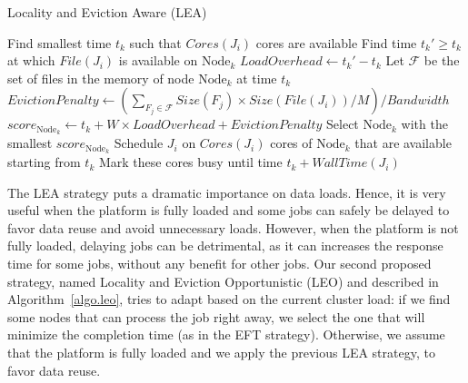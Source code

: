 \documentclass[conference,10pt]{IEEEtran}
\newcommand{\Node}[1]{\ensuremath{\mathrm{Node}_{#1}}\xspace}
\newcommand{\file}{\ensuremath{\mathit{File}}\xspace}
\newcommand{\size}{\ensuremath{\mathit{Size}}\xspace}
\newcommand{\memory}{\ensuremath{\mathit{M}}\xspace}
\newcommand{\bandwidth}{\mathit{Bandwidth}\xspace}
\newcommand{\core}{\mathit{Cores}\xspace}
\newcommand{\walltime}{\mathit{WallTime}\xspace}
\newcommand{\nodeset}{\ensuremath{\mathbb{N}}\xspace}
\begin{document}
\begin{algorithm}[t]%
\caption{Locality and Eviction Aware (LEA)}\label{algo.lea}
\begin{algorithmic}[1]
		\ForEach{$\Node{k} \in \nodeset$}
			\State Find smallest time $t_k$ such that $\core(J_i)$ cores are available
			\State Find time $t_k'\geq t_k$ at which $\file(J_i)$ is available on $\Node{k}$
			\State $\mathit{LoadOverhead} \gets t_k' - t_k$ %
                        \State Let $\mathcal{F}$ be the set of files in the memory of node \Node{k} at time $t_k$
			\State $\mathit{EvictionPenalty} \gets (\sum_{F_j\in\mathcal{F}}\size(F_j) \times \size(\file(J_i))/\memory)/\bandwidth$
			\State $score_{\Node{k}} \gets t_k + W \times \mathit{LoadOverhead} + \mathit{EvictionPenalty}$
		\EndFor
                \State Select \Node{k} with the smallest $score_{\Node{k}}$
                \State Schedule $J_i$ on $\core(J_i)$ cores of \Node{k} that are available starting from $t_k$
                \State Mark these cores busy until time $t_k +\walltime(J_i)$
	\EndFor
\end{algorithmic}
\end{algorithm}


The LEA strategy puts a dramatic importance on data loads. Hence, it
is very useful when the platform is fully loaded and  some jobs
can safely be delayed to favor data reuse and avoid
unnecessary loads. However, when the platform is not fully loaded,
delaying jobs can be detrimental, as it can increases the response
time for some jobs, without any benefit for other jobs. Our second proposed strategy,
named Locality and Eviction Opportunistic (LEO) and described in Algorithm~\ref{algo.leo}, tries to adapt based
on the current cluster load: if we find some nodes that can process the job
right away, we select the one that will minimize the completion time
(as in the EFT strategy). Otherwise, we assume that the platform is
fully loaded and we apply the previous LEA strategy, to favor data reuse.
\end{document}
